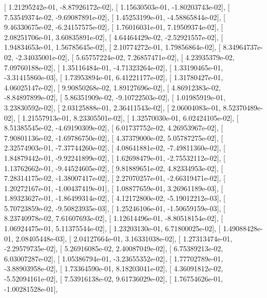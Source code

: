 \documentclass{article}
\begin{document}
       [  1.21295242e-01,  -8.87926172e-02],
       [  1.15630503e-01,  -1.80203743e-02],
       [  7.53549374e-02,  -9.69087891e-02],
       [  1.45253199e-01,  -4.58865844e-02],
       [  9.46330675e-02,  -6.24157575e-02],
       [  1.76016031e-01,   7.19509374e-02],
       [  2.08251706e-01,   3.60835891e-02],
       [  4.64464429e-02,  -2.52921557e-02],
       [  1.94834653e-01,   1.56785645e-02],
       [  2.10774272e-01,   1.79856864e-02],
       [  8.34964737e-02,  -2.34035001e-02],
       [  5.65757224e-02,   7.26857471e-02],
       [  4.23935379e-02,   7.09760188e-02],
       [  1.35116484e-01,  -4.71323264e-02],
       [  1.33190465e-01,  -3.31415860e-03],
       [  1.73953894e-01,   6.41221177e-02],
       [  1.31780427e-01,   4.06025147e-02],
       [  9.90850268e-02,   1.89127696e-02],
       [  4.86912383e-02,  -8.84897899e-02],
       [  5.86351909e-02,  -9.10722503e-02],
       [  1.01985919e-01,   3.23830592e-02],
       [  2.03125888e-01,   2.36411543e-02],
       [  2.06004083e-01,   8.52370489e-02],
       [  1.21557913e-01,   8.23305501e-02],
       [  1.32570030e-01,   6.02424105e-02],
       [  8.51385545e-02,  -4.69190309e-02],
       [  6.01737752e-02,   4.26953967e-02],
       [  7.90801136e-02,  -1.69786750e-02],
       [  4.37379000e-02,   5.05787275e-02],
       [  2.32574903e-01,  -7.37744260e-02],
       [  4.08641881e-02,  -7.49811360e-02],
       [  1.84879442e-01,  -9.92241899e-02],
       [  1.62698479e-01,  -2.75532112e-02],
       [  1.13762662e-01,  -9.44524605e-02],
       [  9.81889651e-02,   4.82334953e-02],
       [  7.28314175e-02,  -1.38007417e-02],
       [  2.27070257e-01,  -2.66319471e-02],
       [  1.20272167e-01,  -1.00437419e-01],
       [  1.08877659e-01,   3.26961189e-03],
       [  1.89323627e-01,  -1.86499314e-02],
       [  4.12172800e-02,  -5.19012212e-03],
       [  5.70723859e-02,  -9.50823935e-03],
       [  1.25246106e-01,  -1.50659159e-03],
       [  8.23740978e-02,   7.61607693e-02],
       [  1.12614496e-01,  -8.80518154e-02],
       [  1.06924475e-01,   5.11375544e-02],
       [  1.23203130e-01,   6.71800025e-02],
       [  1.49088428e-01,   2.08405448e-03],
       [  2.04127664e-01,   3.16331038e-02],
       [  1.27313474e-01,  -2.29579735e-02],
       [  5.26916085e-02,   2.40087049e-02],
       [  6.75389213e-02,   6.03007287e-02],
       [  1.05386794e-01,  -3.23655352e-02],
       [  1.77702789e-01,  -3.88903958e-02],
       [  1.73364590e-01,   8.18203041e-02],
       [  4.36091812e-02,  -5.52094161e-02],
       [  7.53916138e-02,   9.61736029e-02],
       [  1.76754626e-01,  -1.00281528e-01],
\end{document}

